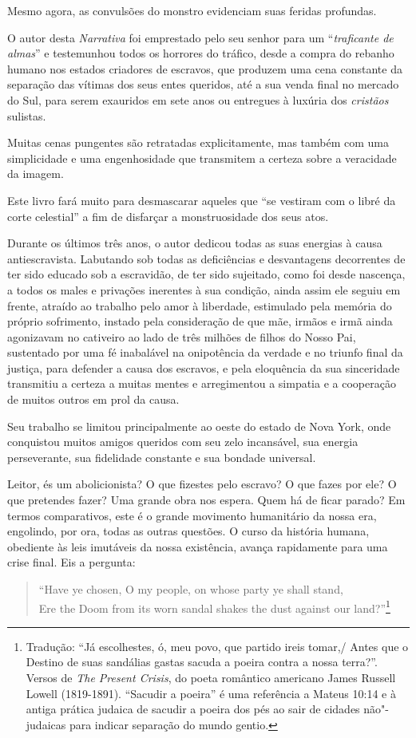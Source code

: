 Mesmo agora, as convulsões do monstro evidenciam suas feridas profundas.

O autor desta \emph{Narrativa} foi emprestado pelo seu senhor para um
``\emph{traficante de almas}'' e testemunhou todos os horrores do
tráfico, desde a compra do rebanho humano nos estados criadores de
escravos, que produzem uma cena constante da separação das vítimas dos
seus entes queridos, até a sua venda final no mercado do Sul, para serem
exauridos em sete anos ou entregues à luxúria dos \emph{cristãos}
sulistas.

Muitas cenas pungentes são retratadas explicitamente, mas também com uma
simplicidade e uma engenhosidade que transmitem a certeza sobre a
veracidade da imagem.

Este livro fará muito para desmascarar aqueles que ``se vestiram com o
libré da corte celestial'' a fim de disfarçar a monstruosidade dos seus
atos.

Durante os últimos três anos, o autor dedicou todas as suas energias à
causa antiescravista. Labutando sob todas as deficiências e desvantagens
decorrentes de ter sido educado sob a escravidão, de ter sido sujeitado,
como foi desde nascença, a todos os males e privações inerentes à sua
condição, ainda assim ele seguiu em frente, atraído ao trabalho pelo
amor à liberdade, estimulado pela memória do próprio sofrimento, instado
pela consideração de que mãe, irmãos e irmã ainda agonizavam no
cativeiro ao lado de três milhões de filhos do Nosso Pai, sustentado por
uma fé inabalável na onipotência da verdade e no triunfo final da
justiça, para defender a causa dos escravos, e pela eloquência da sua
sinceridade transmitiu a certeza a muitas mentes e arregimentou a
simpatia e a cooperação de muitos outros em prol da causa.

Seu trabalho se limitou principalmente ao oeste do estado de Nova York,
onde conquistou muitos amigos queridos com seu zelo incansável, sua
energia perseverante, sua fidelidade constante e sua bondade universal.

Leitor, és um abolicionista? O que fizestes pelo escravo? O que fazes
por ele? O que pretendes fazer? Uma grande obra nos espera. Quem há de
ficar parado? Em termos comparativos, este é o grande movimento
humanitário da nossa era, engolindo, por ora, todas as outras questões.
O curso da história humana, obediente às leis imutáveis da nossa
existência, avança rapidamente para uma crise final. Eis a pergunta:

\begin{verse}
``Have ye chosen, O my people, on whose \qb{}party ye shall stand,\\
Ere the Doom from its worn sandal shakes \qb{}the dust against our land?''\footnote{Tradução: ``Já escolhestes, ó, meu povo, que partido ireis tomar,/ Antes que o Destino de suas sandálias gastas sacuda a poeira contra a
nossa terra?''. Versos de \emph{The Present Crisis}, do poeta
  romântico americano James Russell Lowell (1819-1891). ``Sacudir a
  poeira'' é uma referência a Mateus 10:14 e à antiga prática judaica de
  sacudir a poeira dos pés ao sair de cidades não"-judaicas para indicar
  separação do mundo gentio.}
\end{verse}

